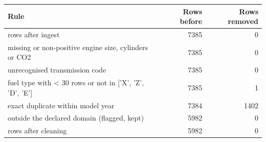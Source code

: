 \begin{tabular}{lrr}
\toprule
Rule & Rows before & Rows removed \\
\midrule
rows after ingest & 7385 & 0 \\
missing or non-positive engine size, cylinders or CO2 & 7385 & 0 \\
unrecognised transmission code & 7385 & 0 \\
fuel type with < 30 rows or not in ['X', 'Z', 'D', 'E'] & 7385 & 1 \\
exact duplicate within model year & 7384 & 1402 \\
outside the declared domain (flagged, kept) & 5982 & 0 \\
rows after cleaning & 5982 & 0 \\
\bottomrule
\end{tabular}
